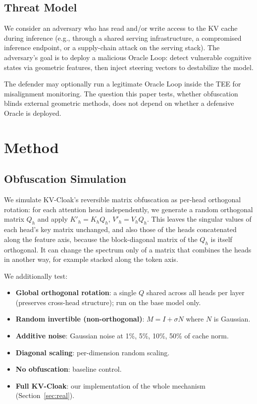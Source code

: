 \subsection{Threat Model}

We consider an adversary who has read and/or write access to the
KV cache during inference (e.g., through a shared serving infrastructure,
a compromised inference endpoint, or a supply-chain attack on the
serving stack). The adversary's goal is to deploy a malicious Oracle
Loop: detect vulnerable cognitive states via geometric features, then
inject steering vectors to destabilize the model.

The defender may optionally run a legitimate Oracle Loop inside the TEE
for misalignment monitoring. The question this paper tests, whether
obfuscation blinds external geometric methods, does not depend on whether
a defensive Oracle is deployed.

\section{Method}

\subsection{Obfuscation Simulation}
\label{sec:method_rot}

We simulate KV-Cloak's reversible matrix obfuscation as per-head
orthogonal rotation: for each attention head independently, we generate
a random orthogonal matrix $Q_h$ and apply $K'_h = K_h Q_h$,
$V'_h = V_h Q_h$. This leaves the singular values of each head's key
matrix unchanged, and also those of the heads concatenated along the
feature axis, because the block-diagonal matrix of the $Q_h$ is itself
orthogonal. It can change the spectrum only of a matrix that combines the
heads in another way, for example stacked along the token axis.

We additionally test:
\begin{itemize}
\item \textbf{Global orthogonal rotation}: a single $Q$ shared across
all heads per layer (preserves cross-head structure); run on the base
model only.
\item \textbf{Random invertible (non-orthogonal)}: $M = I + \sigma N$
where $N$ is Gaussian.
\item \textbf{Additive noise}: Gaussian noise at 1\%, 5\%, 10\%, 50\%
of cache norm.
\item \textbf{Diagonal scaling}: per-dimension random scaling.
\item \textbf{No obfuscation}: baseline control.
\item \textbf{Full KV-Cloak}: our implementation of the whole mechanism
(Section~\ref{sec:real}).
\end{itemize}

